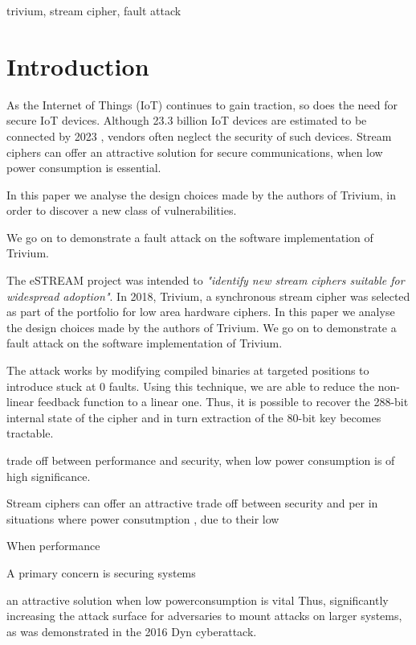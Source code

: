 \documentclass[conference]{IEEEtran}
\begin{document}
\begin{IEEEkeywords}
trivium, stream cipher, fault attack
\end{IEEEkeywords}

\section{Introduction}

As the Internet of Things (IoT) continues to gain traction, so does the need for secure IoT devices. Although 23.3 billion IoT devices are estimated to be connected by 2023 \cite{iot}, vendors often neglect the security of such devices. Stream ciphers can offer an attractive solution for secure communications, when low power consumption is essential.




In this paper we analyse the design choices made by the authors of Trivium, in order to discover a new class of vulnerabilities. 


We go on to demonstrate a fault attack on the software implementation of Trivium.



The eSTREAM project was intended to \textit{"identify new stream ciphers suitable for widespread adoption"}.\cite{call} In 2018, Trivium, a synchronous stream cipher was selected as part of the portfolio for low area hardware ciphers. In this paper we analyse the design choices made by the authors of Trivium. We go on to demonstrate a fault attack on the software implementation of Trivium. 

The attack works by modifying compiled binaries at targeted positions to introduce stuck at 0 faults. Using this technique, we are able to reduce the non-linear feedback function to a linear one. Thus, it is possible to recover the 288-bit internal state of the cipher and in turn extraction of the 80-bit key becomes tractable.


trade off between performance and security, when low power consumption is of high significance. 


Stream ciphers can offer an attractive trade off between security and per in situations where power consutmption 
, due to their low


When performance 

A primary concern is securing systems 

an attractive solution when low powerconsumption is vital 
Thus, significantly increasing the attack surface for adversaries to mount attacks on larger systems, as was demonstrated in the 2016 Dyn cyberattack.
\end{document}
